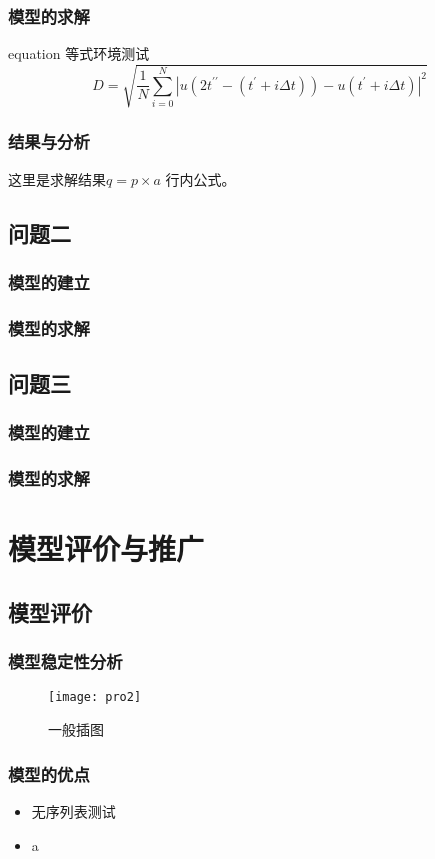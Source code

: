 \documentclass{cumcmthesis}
\begin{document}
\subsubsection{模型的求解}
equation 等式环境测试
\begin{equation}\label{D}
    D=\sqrt{\frac{1}{N}\sum_{i=0}^N{\left| u\left( 2t^{\prime\prime}-\left( t^\prime+i\Delta t \right) \right) -u\left( t^\prime+i\Delta t \right) \right|}^2}
\end{equation}
\subsubsection{结果与分析}
这里是求解结果$q=p\times a$ 行内公式。
\subsection{问题二}
\subsubsection{模型的建立}
\subsubsection{模型的求解}
\subsection{问题三}
\subsubsection{模型的建立}
\subsubsection{模型的求解}
\section{模型评价与推广}
\subsection{模型评价}
\subsubsection{模型稳定性分析}
\begin{figure}[!htbp]
    \centering
    \texttt{[image: pro2]}
    \caption[]{一般插图}
\end{figure}
\subsubsection{模型的优点}
\begin{itemize}
    \item 无序列表测试
    \item a
\end{itemize}
\end{document}
